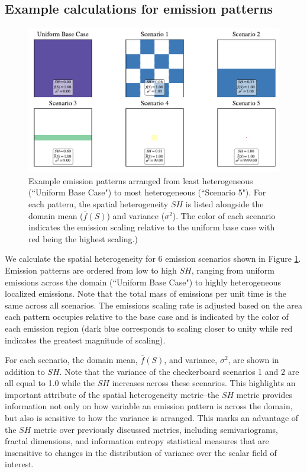 \subsection{Example calculations for emission patterns}

\begin{figure}[!t]
	\centering
	\includegraphics[width=\textwidth]{figures/chapter2/SH-scenarios-all.pdf}
	\caption{Example emission patterns arranged from least heterogeneous (``Uniform Base Case") to most heterogeneous (``Scenario 5").  For each pattern, the spatial heterogeneity $SH$ is listed alongside the domain mean ($\overline{f}(S)$) and variance ($\sigma^2$). The color of each scenario indicates the emission scaling relative to the uniform base case with red being the highest scaling.)}
	\label{fig:emission-patterns}
\end{figure}

We calculate the spatial heterogeneity for 6 emission scenarios shown in Figure \ref{fig:emission-patterns}. Emission patterns are ordered from low to high $SH$, ranging from uniform emissions across the domain (``Uniform Base Case") to highly heterogeneous localized emissions. Note that the total mass of emissions per unit time is the same across all scenarios. The emissions scaling rate is adjusted based on the area each pattern occupies relative to the base case and is indicated by the color of each emission region (dark blue corresponds to scaling closer to unity while red indicates the greatest magnitude of scaling). 

For each scenario, the domain mean, $\overline{f}(S)$, and variance, $\sigma^2$, are shown in addition to $SH$. Note that the variance of the checkerboard scenarios 1 and 2 are all equal to 1.0 while the $SH$ increases across these scenarios. This highlights an important attribute of the spatial heterogeneity metric--the $SH$ metric provides information not only on how variable an emission pattern is across the domain, but also is sensitive to how the variance is arranged. This marks an advantage of the $SH$ metric over previously discussed metrics, including semivariograms, fractal dimensions, and information entropy statistical measures that are insensitive to changes in the distribution of variance over the scalar field of interest.
